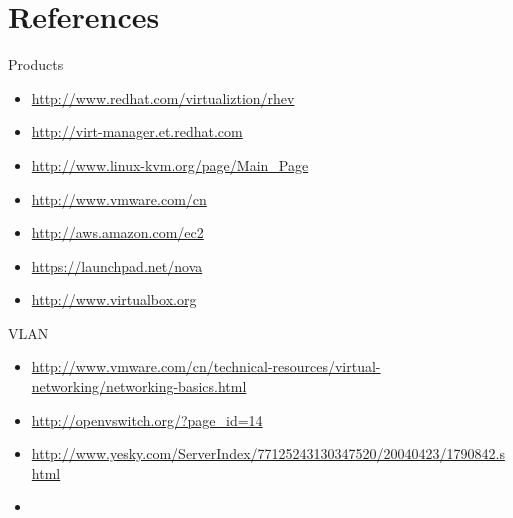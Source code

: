 \chapter{References}

Products
\begin{itemize}
  \item \url{http://www.redhat.com/virtualiztion/rhev}
  \item \url{http://virt-manager.et.redhat.com}
  \item \url{http://www.linux-kvm.org/page/Main_Page}
  \item \url{http://www.vmware.com/cn}
  \item \url{http://aws.amazon.com/ec2}
  \item \url{https://launchpad.net/nova}
  \item \url{http://www.virtualbox.org}
\end{itemize}

VLAN
\begin{itemize}
  \item \url{http://www.vmware.com/cn/technical-resources/virtual-networking/networking-basics.html}
  \item \url{http://openvswitch.org/?page_id=14}
  \item \url{http://www.yesky.com/ServerIndex/77125243130347520/20040423/1790842.shtml}
  \item 
\end{itemize}
